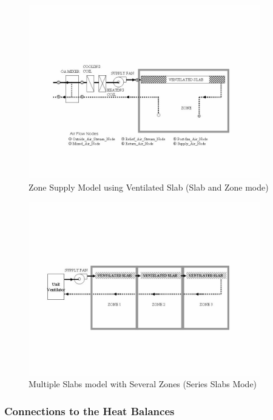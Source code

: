 \begin{figure}[hbtp] %
\centering
\includegraphics[width=0.9\textwidth, height=0.9\textheight, keepaspectratio=true]{media/image7398.png}
\caption{Zone Supply Model using Ventilated Slab (Slab and Zone mode) \protect \label{fig:zone-supply-model-using-ventilated-slab-slab}}
\end{figure}

\begin{figure}[hbtp] %
\centering
\includegraphics[width=0.9\textwidth, height=0.9\textheight, keepaspectratio=true]{media/image7399.png}
\caption{Multiple Slabs model with Several Zones (Series Slabs Mode) \protect \label{fig:multiple-slabs-model-with-several-zones}}
\end{figure}

\subsubsection{Connections to the Heat Balances}\label{connections-to-the-heat-balances}

